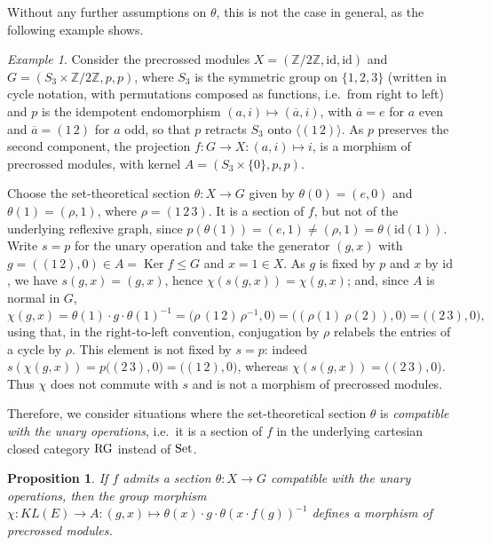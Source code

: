 \documentclass[a4paper, british, reqno]{amsart}
\newcommand*{\from}{\colon}
\newcommand*{\mapping}{\colon}
\DeclareMathOperator{\Ker}{Ker} %
\newcommand*{\CatName}[1]{\textnormal{#1}}
\newcommand*{\RG}{\CatName{RG}}
\newcommand*{\Set}{\CatName{Set}}
\newtheorem{proposition}[theorem]{Proposition}
\theoremstyle{definition}
\theoremstyle{remark}
\newtheorem{example}[theorem]{Example}
\begin{document}
Without any further assumptions on \(\theta\), this is not the case in general, as the following example shows.

\begin{example}
	\label{ex - chi not compatible}
	Consider the precrossed modules \(X=(\mathbb{Z}/2\mathbb{Z},\mathrm{id},\mathrm{id})\) and \(G=(S_3\times\mathbb{Z}/2\mathbb{Z},p,p)\), where \(S_3\) is the symmetric group on \(\{1,2,3\}\) (written in cycle notation, with permutations composed as functions, i.e.\ from right to left) and \(p\) is the idempotent endomorphism \((a,i)\mapsto(\overline{a},i)\), with \(\overline{a}=e\) for \(a\) even and \(\overline{a}=(1\,2)\) for \(a\) odd, so that \(p\) retracts \(S_3\) onto \(\langle(1\,2)\rangle\). As \(p\) preserves the second component, the projection \(f\colon G\to X \mapping (a,i)\mapsto i\), is a morphism of precrossed modules, with kernel \(A=(S_3\times\{0\},p,p)\).

	Choose the set-theoretical section \(\theta\colon X\to G\) given by \(\theta(0)=(e,0)\) and \(\theta(1)=(\rho,1)\), where \(\rho=(1\,2\,3)\). It is a section of \(f\), but not of the underlying reflexive graph, since \(p(\theta(1))=(e,1)\neq(\rho,1)=\theta(\mathrm{id}(1))\). Write \(s=p\) for the unary operation and take the generator \((g,x)\) with \(g=((1\,2),0)\in A = \Ker f \leq G\) and \(x=1\in X\). As \(g\) is fixed by \(p\) and \(x\) by \(\mathrm{id}\), we have \(s(g,x)=(g,x)\), hence \(\chi(s(g,x))=\chi(g,x)\); and, since \(A\) is normal in \(G\),
	\[
		\chi(g,x)=\theta(1)\cdot g\cdot\theta(1)^{-1}=\bigl(\rho\,(1\,2)\,\rho^{-1},0\bigr)=\bigl((\rho(1)\ \rho(2)),0\bigr)=\bigl((2\,3),0\bigr)\text{,}
	\]
	using that, in the right-to-left convention, conjugation by \(\rho\) relabels the entries of a cycle by \(\rho\).
	This element is not fixed by \(s=p\): indeed \(s(\chi(g,x))=p\bigl((2\,3),0\bigr)=\bigl((1\,2),0\bigr)\), whereas \(\chi(s(g,x))=\bigl((2\,3),0\bigr)\). Thus \(\chi\) does not commute with \(s\) and is not a morphism of precrossed modules.
\end{example}

Therefore, we consider situations where the set-theoretical section \(\theta\) is \emph{compatible with the unary operations}, i.e.\ it is a section of \(f\) in the underlying cartesian closed category \(\RG\) instead of \(\Set\).

\begin{proposition}
	\label{prop:chi morphism}
	If \(f\) admits a section \(\theta \from X \to G\) compatible with the unary operations, then the group morphism \(\chi \colon KL(E)\to A \mapping (g,x) \mapsto \theta(x)\cdot g \cdot \theta(x\cdot f(g))^{-1}\) defines a morphism of precrossed modules.
\end{proposition}
\end{document}
